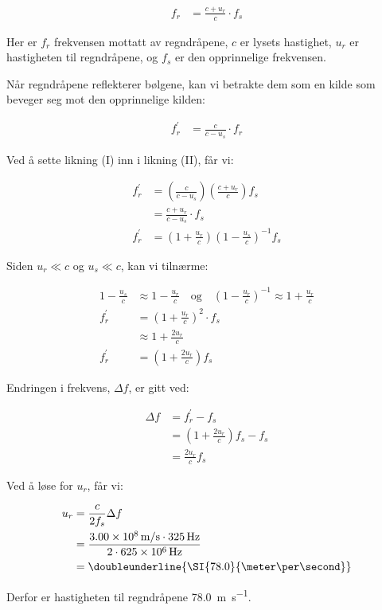 \documentclass[answers,a4paper,12pt]{exam}
\begin{document}
\begin{questions}
\begin{parts}
\begin{solution}
\begin{align}
f_{r} &= \frac{c + u_{r}}{c} \cdot f_{s} \tag{I}
\end{align}

Her er $f_{r}$ frekvensen mottatt av regndråpene, $c$ er lysets hastighet, $u_{r}$ er hastigheten til regndråpene, og $f_{s}$ er den opprinnelige frekvensen.

Når regndråpene reflekterer bølgene, kan vi betrakte dem som en kilde som beveger seg mot den opprinnelige kilden:

\begin{align}
f_{r}^{\prime} &= \frac{c}{c - u_{s}} \cdot f_{r} \tag{II}
\end{align}

Ved å sette likning (I) inn i likning (II), får vi:

\begin{align}
f_{r}^{\prime} &= \left(\frac{c}{c-u_{s}}\right)\left(\frac{c+u_{r}}{c}\right) f_{s} \\
&= \frac{c+u_{r}}{c-u_{s}} \cdot f_{s} \\
f_{r}^{\prime} &= \left(1+\frac{u_{r}}{c}\right)\left(1-\frac{u_{s}}{c}\right)^{-1} f_{s}
\end{align}

Siden $u_{r} \ll c$ og $u_{s} \ll c$, kan vi tilnærme:

\begin{align}
1-\frac{u_{s}}{c} &\approx 1-\frac{u_{r}}{c} \quad \text{og} \quad \left(1-\frac{u_{r}}{c}\right)^{-1} \approx 1+\frac{u_{r}}{c} \\
f_{r}^{\prime} &= \left(1+\frac{u_{r}}{c}\right)^{2} \cdot f_{s} \\
&\approx 1+\frac{2 u_{r}}{c} \\
f_{r}^{\prime} &= \left(1+\frac{2 u_{r}}{c}\right) f_{s}
\end{align}

Endringen i frekvens, $\Delta f$, er gitt ved:

\begin{align}
\Delta f &= f_{r}^{\prime} - f_{s} \\
&= \left(1+\frac{2 u_{r}}{c}\right) f_{s} - f_{s} \\
&= \frac{2 u_{r}}{c} f_{s}
\end{align}

Ved å løse for $u_{r}$, får vi:

\begin{align}
u_{r} &= \frac{c}{2 f_{s}} \Delta f \\
&= \frac{3.00 \times 10^{8} \, \mathrm{m/s} \cdot 325 \, \mathrm{Hz}}{2 \cdot 625 \times 10^{6} \, \mathrm{Hz}} \\
&= \doubleunderline{\SI{78.0}{\meter\per\second}}
\end{align}

Derfor er hastigheten til regndråpene \SI{78.0}{\meter\per\second}.
\end{solution}

\end{parts}
\end{questions}
\end{document}
